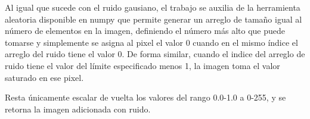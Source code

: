 	\hfill\break
	\justifying
	Al igual que sucede con el ruido gausiano, el trabajo se auxilia de la herramienta aleatoria disponible en numpy que permite generar un arreglo de tamaño igual al número de elementos en la imagen, definiendo el número más alto que puede tomarse y simplemente se asigna al pixel el valor 0 cuando en el mismo índice el arreglo del ruido tiene el valor 0. De forma similar, cuando el indice del arreglo de ruido tiene el valor del límite especificado menos 1, la imagen toma el valor saturado en ese pixel.
	
	\hfill\break
	\justifying
	Resta únicamente escalar de vuelta los valores del rango 0.0-1.0 a 0-255, y se retorna la imagen adicionada con ruido.